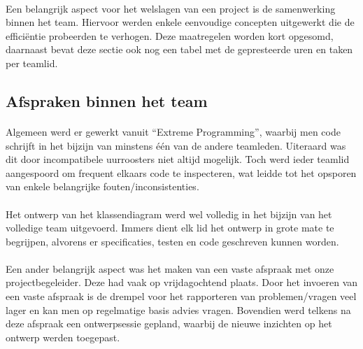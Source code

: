 \label{projectbeheer}
\paragraph{}
Een belangrijk aspect voor het welslagen van een project is de samenwerking binnen het team. Hiervoor werden enkele eenvoudige concepten uitgewerkt die de effici\"entie probeerden te verhogen. Deze maatregelen worden kort opgesomd, daarnaast bevat deze sectie ook nog een tabel met de gepresteerde uren en taken per teamlid.
\subsection{Afspraken binnen het team}
\paragraph{}
Algemeen werd er gewerkt vanuit ``Extreme Programming'', waarbij men code schrijft in het bijzijn van minstens \'e\'en van de andere teamleden. Uiteraard was dit door incompatibele uurroosters niet altijd mogelijk. Toch werd ieder teamlid aangespoord om frequent elkaars code te inspecteren, wat leidde tot het opsporen van enkele belangrijke fouten/inconsistenties.
\paragraph{}
Het ontwerp van het klassendiagram werd wel volledig in het bijzijn van het volledige team uitgevoerd. Immers dient elk lid het ontwerp in grote mate te begrijpen, alvorens er specificaties, testen en code geschreven kunnen worden.
\paragraph{}
Een ander belangrijk aspect was het maken van een vaste afspraak met onze projectbegeleider. Deze had vaak op vrijdagochtend plaats. Door het invoeren van een vaste afspraak is de drempel voor het rapporteren van problemen/vragen veel lager en kan men op regelmatige basis advies vragen. Bovendien werd telkens na deze afspraak een ontwerpsessie gepland, waarbij de nieuwe inzichten op het ontwerp werden toegepast.
